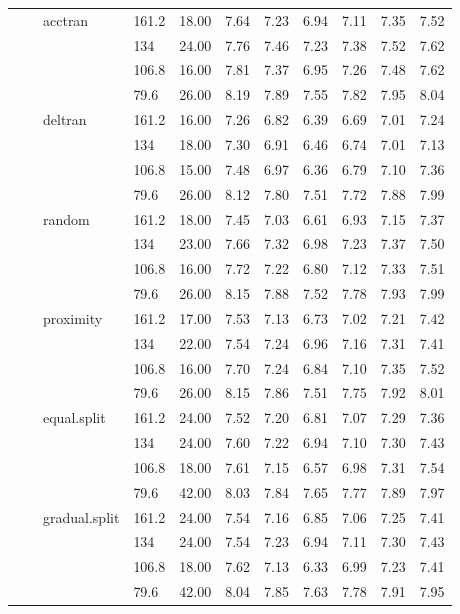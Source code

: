 \begin{longtable}{llllrrrrrrr}
   &  & acctran & 161.2 & 18.00 & 7.64 & 7.23 & 6.94 & 7.11 & 7.35 & 7.52 \\ 
   &  &  & 134 & 24.00 & 7.76 & 7.46 & 7.23 & 7.38 & 7.52 & 7.62 \\ 
   &  &  & 106.8 & 16.00 & 7.81 & 7.37 & 6.95 & 7.26 & 7.48 & 7.62 \\ 
   &  &  & 79.6 & 26.00 & 8.19 & 7.89 & 7.55 & 7.82 & 7.95 & 8.04 \\ 
   &  & deltran & 161.2 & 16.00 & 7.26 & 6.82 & 6.39 & 6.69 & 7.01 & 7.24 \\ 
   &  &  & 134 & 18.00 & 7.30 & 6.91 & 6.46 & 6.74 & 7.01 & 7.13 \\ 
   &  &  & 106.8 & 15.00 & 7.48 & 6.97 & 6.36 & 6.79 & 7.10 & 7.36 \\ 
   &  &  & 79.6 & 26.00 & 8.12 & 7.80 & 7.51 & 7.72 & 7.88 & 7.99 \\ 
   &  & random & 161.2 & 18.00 & 7.45 & 7.03 & 6.61 & 6.93 & 7.15 & 7.37 \\ 
   &  &  & 134 & 23.00 & 7.66 & 7.32 & 6.98 & 7.23 & 7.37 & 7.50 \\ 
   &  &  & 106.8 & 16.00 & 7.72 & 7.22 & 6.80 & 7.12 & 7.33 & 7.51 \\ 
   &  &  & 79.6 & 26.00 & 8.15 & 7.88 & 7.52 & 7.78 & 7.93 & 7.99 \\ 
   &  & proximity & 161.2 & 17.00 & 7.53 & 7.13 & 6.73 & 7.02 & 7.21 & 7.42 \\ 
   &  &  & 134 & 22.00 & 7.54 & 7.24 & 6.96 & 7.16 & 7.31 & 7.41 \\ 
   &  &  & 106.8 & 16.00 & 7.70 & 7.24 & 6.84 & 7.10 & 7.35 & 7.52 \\ 
   &  &  & 79.6 & 26.00 & 8.15 & 7.86 & 7.51 & 7.75 & 7.92 & 8.01 \\ 
   &  & equal.split & 161.2 & 24.00 & 7.52 & 7.20 & 6.81 & 7.07 & 7.29 & 7.36 \\ 
   &  &  & 134 & 24.00 & 7.60 & 7.22 & 6.94 & 7.10 & 7.30 & 7.43 \\ 
   &  &  & 106.8 & 18.00 & 7.61 & 7.15 & 6.57 & 6.98 & 7.31 & 7.54 \\ 
   &  &  & 79.6 & 42.00 & 8.03 & 7.84 & 7.65 & 7.77 & 7.89 & 7.97 \\ 
   &  & gradual.split & 161.2 & 24.00 & 7.54 & 7.16 & 6.85 & 7.06 & 7.25 & 7.41 \\ 
   &  &  & 134 & 24.00 & 7.54 & 7.23 & 6.94 & 7.11 & 7.30 & 7.43 \\ 
   &  &  & 106.8 & 18.00 & 7.62 & 7.13 & 6.33 & 6.99 & 7.23 & 7.41 \\ 
   &  &  & 79.6 & 42.00 & 8.04 & 7.85 & 7.63 & 7.78 & 7.91 & 7.95 \\ 

\end{longtable}
